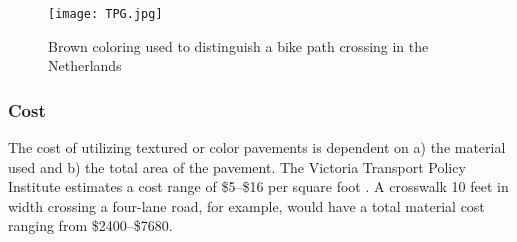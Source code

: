 \begin{figure}[!htbp]
\centering
\texttt{[image: TPG.jpg]}
\caption[Brown coloring used to distinguish a bike path crossing in the Netherlands]{Brown coloring used to distinguish a bike path crossing in the Netherlands}\label{fig:TPG}
\end{figure}

\subsubsection{Cost}

The cost of utilizing textured or color pavements is dependent on a) the material used and b) the total area of the pavement. The Victoria Transport Policy Institute estimates a cost range of \$5--\$16 per square foot \cite{TP3}. A crosswalk 10 feet in width crossing a four-lane road, for example, would have a total material cost ranging from \$2400--\$7680.
